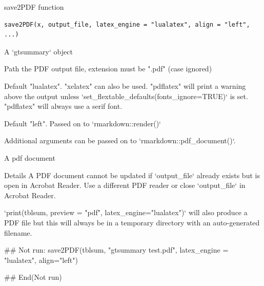 \documentclass[a4paper]{book}
\begin{document}
%
\begin{Description}
save2PDF function
\end{Description}
%
\begin{Usage}
\begin{verbatim}
save2PDF(x, output_file, latex_engine = "lualatex", align = "left", ...)
\end{verbatim}
\end{Usage}
%
\begin{Arguments}
\begin{ldescription}
\item[\code{x}] A `gtsummary` object

\item[\code{output\_file}] Path the PDF output file, extension must be ".pdf" (case ignored)

\item[\code{latex\_engine}] Default "lualatex". "xelatex" can also be used. "pdflatex"
will print a warning above the output unless `set\_flextable\_defaults(fonts\_ignore=TRUE)`
is set. "pdflatex" will always use a serif font.

\item[\code{align}] Default "left". Passed on to `rmarkdown::render()`

\item[\code{...}] Additional arguments can be passed on to `rmarkdown::pdf\_document()`.
\end{ldescription}
\end{Arguments}
%
\begin{Value}
A pdf document
\end{Value}
%
\begin{Section}{Details}
A PDF document cannot be updated if `output\_file` already
exists but is open in Acrobat Reader. Use  a different PDF reader or close
`output\_file` in Acrobat Reader.

`print(tblsum, preview = "pdf", latex\_engine="lualatex")` will also produce
a PDF file but this will always be in a temporary directory with an auto-generated
filename.
\end{Section}
%
\begin{Examples}
\begin{ExampleCode}
## Not run: 
save2PDF(tblsum, "gtsummary test.pdf", latex_engine = "lualatex", align="left")

## End(Not run)
\end{ExampleCode}
\end{Examples}
\printindex{}
\end{document}
